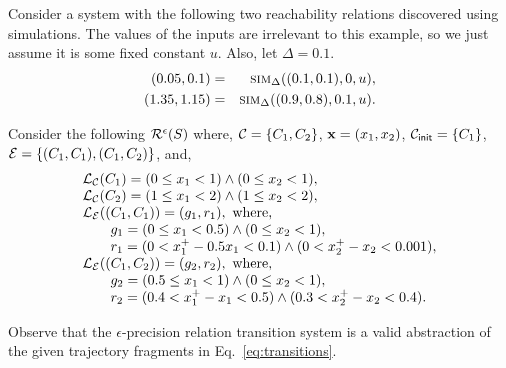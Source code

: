 \begin{example}
Consider a system with the following two reachability relations
discovered using simulations. The values of the inputs are irrelevant
to this example, so we just assume it is some fixed constant $u$.
Also, let $\Delta = 0.1$.
\begin{eqnarray}
\label{eq:transitions}
(0.05, 0.1) & = & \mbox{\sc sim}_\Delta((0.1, 0.1), 0, u), \\
(1.35,1.15) & = & \mbox{\sc sim}_\Delta((0.9, 0.8), 0.1, u).
\end{eqnarray}

Consider the following $\mathcal{R}^{\epsilon}(S)$ where,
$\mathcal{C} = \{C_1,C_2\}$, $\mathbf{x} = (x_1,x_2)$, $\mathcal{C}_{\mathsf{init}} = \{C_1\}$,
$\mathcal{E} = \{(C_1,C_1), (C_1, C_2)\}$, and,
\[ 
\begin{array}{l}
\mathcal{L}_\mathcal{C}(C_1) = (0 \le x_1 < 1) \wedge (0 \le x_2 < 1), \\
\mathcal{L}_\mathcal{C}(C_2) = (1 \le x_1 < 2) \wedge (1 \le x_2 < 2), \\
\mathcal{L}_\mathcal{E}((C_1,C_1)) = (g_1,r_1), \text{ where, } \\
\qquad g_1 = (0 \le x_1 < 0.5) \wedge (0 \le x_2 < 1), \\
\qquad r_1 = (0 < x^+_1 - 0.5x_1 < 0.1) \wedge (0 < x^+_2 - x_2 < 0.001), \\
\mathcal{L}_\mathcal{E}((C_1,C_2)) = (g_2,r_2), \text{ where, } \\
\qquad g_2 = (0.5 \le x_1 < 1) \wedge (0 \le x_2 < 1), \\
\qquad r_2 = (0.4 < x^+_1 - x_1 < 0.5) \wedge (0.3 < x^+_2 - x_2 < 0.4). \\
\end{array}
\]

Observe that the $\epsilon$-precision relation transition system is a
valid abstraction of the given trajectory fragments in
Eq.~\ref{eq:transitions}.
\end{example}







